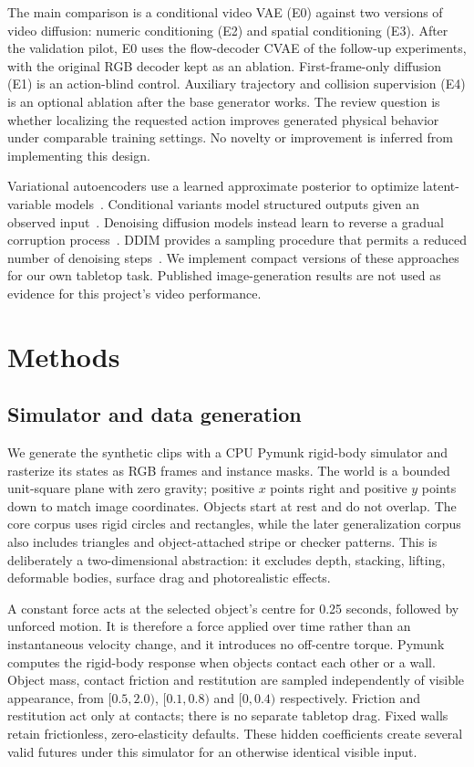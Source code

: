 \documentclass[11pt,a4paper]{article}
\begin{document}
The main comparison is a conditional video VAE (E0) against two versions of video diffusion: numeric conditioning (E2) and spatial conditioning (E3). After the validation pilot, E0 uses the flow-decoder CVAE of the follow-up experiments, with the original RGB decoder kept as an ablation. First-frame-only diffusion (E1) is an action-blind control. Auxiliary trajectory and collision supervision (E4) is an optional ablation after the base generator works. The review question is whether localizing the requested action improves generated physical behavior under comparable training settings. No novelty or improvement is inferred from implementing this design.

Variational autoencoders use a learned approximate posterior to optimize latent-variable models~\cite{kingma}. Conditional variants model structured outputs given an observed input~\cite{sohn}. Denoising diffusion models instead learn to reverse a gradual corruption process~\cite{ho}. DDIM provides a sampling procedure that permits a reduced number of denoising steps~\cite{song}. We implement compact versions of these approaches for our own tabletop task. Published image-generation results are not used as evidence for this project's video performance.

\section{Methods}
\subsection{Simulator and data generation}
We generate the synthetic clips with a CPU Pymunk rigid-body simulator and rasterize its states as RGB frames and instance masks. The world is a bounded unit-square plane with zero gravity; positive $x$ points right and positive $y$ points down to match image coordinates. Objects start at rest and do not overlap. The core corpus uses rigid circles and rectangles, while the later generalization corpus also includes triangles and object-attached stripe or checker patterns. This is deliberately a two-dimensional abstraction: it excludes depth, stacking, lifting, deformable bodies, surface drag and photorealistic effects.

A constant force acts at the selected object's centre for 0.25 seconds, followed by unforced motion. It is therefore a force applied over time rather than an instantaneous velocity change, and it introduces no off-centre torque. Pymunk computes the rigid-body response when objects contact each other or a wall. Object mass, contact friction and restitution are sampled independently of visible appearance, from $[0.5,2.0)$, $[0.1,0.8)$ and $[0,0.4)$ respectively. Friction and restitution act only at contacts; there is no separate tabletop drag. Fixed walls retain frictionless, zero-elasticity defaults. These hidden coefficients create several valid futures under this simulator for an otherwise identical visible input.
\end{document}
